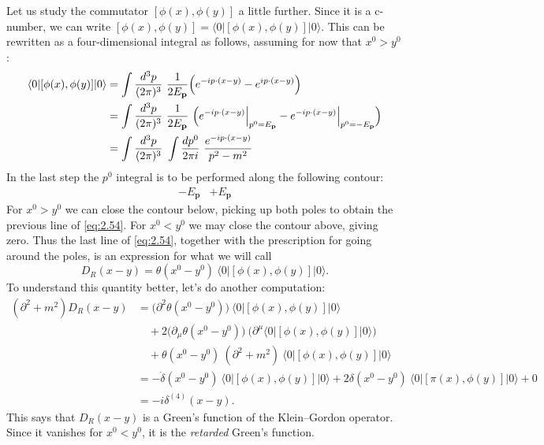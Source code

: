 Let us study the commutator $[\phi(x), \phi(y)]$ a little further.  Since
it is a c-number, we can write $[\phi(x), \phi(y)] = \langle 0|[\phi(x),
\phi(y)]|0\rangle$.  This can be rewritten as a four-dimensional integral
as follows, assuming for now that $x^0>y^0$:
\begin{align}
  \langle 0|[\phi(x), \phi(y)]|0\rangle
  &= \int \frac{d^3p}{(2\pi)^3}\
    \frac{1}{2E_{\mathbf{p}}}\Bigl( e^{-ip\cdot(x-y)} - e^{ip\cdot(x-y)}
      \Bigr)\\
  &= \int \frac{d^3p}{(2\pi)^3}\ \frac{1}{2E_{\mathbf{p}}}\
    \Bigl( e^{-ip\cdot(x-y)}\Big|_{p^0=E_{\mathbf{p}}}
      - e^{-ip\cdot(x-y)}\Big|_{p^0=-E_{\mathbf{p}}} \Bigr)\\
  &= \int \frac{d^3p}{(2\pi)^3}\ \int \frac{dp^0}{2\pi i}\
    \frac{e^{-ip\cdot(x-y)}}{p^2-m^2}
  \label{eq:2.54}
\end{align}
In the last step the $p^0$ integral is to be performed along the following
contour:
\[
  \begin{array}{cc}
    -E_{\mathbf{p}} & +E_{\mathbf{p}}
  \end{array}
\]
For $x^0>y^0$ we can close the contour below, picking up both poles to
obtain the previous line of \eqref{eq:2.54}.  For $x^0<y^0$ we may close
the contour above, giving zero.  Thus the last line of \eqref{eq:2.54},
together with the prescription for going around the poles, is an
expression for what we will call
\begin{equation}
  D_R(x-y) = \theta(x^0-y^0)\ \langle 0|[\phi(x), \phi(y)]|0\rangle .
  \label{eq:2.55}
\end{equation}
To understand this quantity better, let's do another computation:
\begin{align}
  (\partial^2 + m^2)D_R(x-y)
  &= \bigl(\partial^2\theta(x^0-y^0)\bigr)\ \langle 0|[\phi(x), \phi(y)]|0\rangle\\
  &\quad + 2\bigl(\partial_\mu\theta(x^0-y^0)\bigr)\
    \bigl(\partial^\mu\langle 0|[\phi(x), \phi(y)]|0\rangle\bigr)\\
  &\quad + \theta(x^0-y^0)\ (\partial^2+m^2)\ \langle 0|[\phi(x), \phi(y)]|0\rangle\\
  &= -\dot{\delta}(x^0-y^0)\ \langle 0|[\phi(x), \phi(y)]|0\rangle
    + 2\delta(x^0-y^0)\ \langle 0|[\pi(x), \phi(y)]|0\rangle + 0\\
  &= -i\delta^{(4)}(x-y).
  \label{eq:2.56}
\end{align}
This says that $D_R(x-y)$ is a Green's function of the Klein--Gordon
operator.  Since it vanishes for $x^0<y^0$, it is the \emph{retarded}
Green's function.

